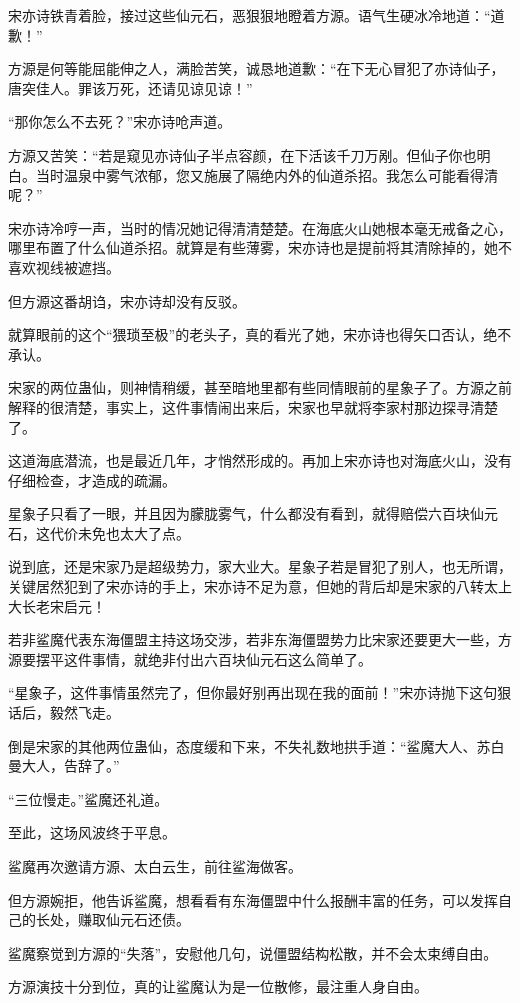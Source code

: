 \begin{this_body}
宋亦诗铁青着脸，接过这些仙元石，恶狠狠地瞪着方源。语气生硬冰冷地道：“道歉！”

方源是何等能屈能伸之人，满脸苦笑，诚恳地道歉：“在下无心冒犯了亦诗仙子，唐突佳人。罪该万死，还请见谅见谅！”

“那你怎么不去死？”宋亦诗呛声道。

方源又苦笑：“若是窥见亦诗仙子半点容颜，在下活该千刀万剐。但仙子你也明白。当时温泉中雾气浓郁，您又施展了隔绝内外的仙道杀招。我怎么可能看得清呢？”

宋亦诗冷哼一声，当时的情况她记得清清楚楚。在海底火山她根本毫无戒备之心，哪里布置了什么仙道杀招。就算是有些薄雾，宋亦诗也是提前将其清除掉的，她不喜欢视线被遮挡。

但方源这番胡诌，宋亦诗却没有反驳。

就算眼前的这个“猥琐至极”的老头子，真的看光了她，宋亦诗也得矢口否认，绝不承认。

宋家的两位蛊仙，则神情稍缓，甚至暗地里都有些同情眼前的星象子了。方源之前解释的很清楚，事实上，这件事情闹出来后，宋家也早就将李家村那边探寻清楚了。

这道海底潜流，也是最近几年，才悄然形成的。再加上宋亦诗也对海底火山，没有仔细检查，才造成的疏漏。

星象子只看了一眼，并且因为朦胧雾气，什么都没有看到，就得赔偿六百块仙元石，这代价未免也太大了点。

说到底，还是宋家乃是超级势力，家大业大。星象子若是冒犯了别人，也无所谓，关键居然犯到了宋亦诗的手上，宋亦诗不足为意，但她的背后却是宋家的八转太上大长老宋启元！

若非鲨魔代表东海僵盟主持这场交涉，若非东海僵盟势力比宋家还要更大一些，方源要摆平这件事情，就绝非付出六百块仙元石这么简单了。

“星象子，这件事情虽然完了，但你最好别再出现在我的面前！”宋亦诗抛下这句狠话后，毅然飞走。

倒是宋家的其他两位蛊仙，态度缓和下来，不失礼数地拱手道：“鲨魔大人、苏白曼大人，告辞了。”

“三位慢走。”鲨魔还礼道。

至此，这场风波终于平息。

鲨魔再次邀请方源、太白云生，前往鲨海做客。

但方源婉拒，他告诉鲨魔，想看看有东海僵盟中什么报酬丰富的任务，可以发挥自己的长处，赚取仙元石还债。

鲨魔察觉到方源的“失落”，安慰他几句，说僵盟结构松散，并不会太束缚自由。

方源演技十分到位，真的让鲨魔认为是一位散修，最注重人身自由。


\end{this_body}
